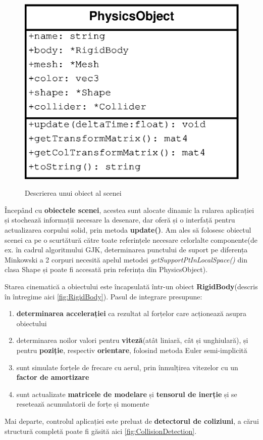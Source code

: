 \documentclass[12pt,a4paper]{report}
\begin{document}
\begin{figure}[H]
	\centering
	\includegraphics[width=0.4\linewidth]{pics/cap4_00.eps}
	\label{fig:physicsObject}
	\caption[]{Descrierea unui obiect al scenei}
\end{figure}

Începând cu \textbf{obiectele scenei}, acestea sunt alocate dinamic la rularea aplicației și stochează informații necesare la desenare, dar oferă și o interfață pentru actualizarea corpului solid, prin metoda \textbf{update()}. Am ales să folosesc obiectul scenei ca pe o scurtătură către toate referințele necesare celorlalte componente(de ex. în cadrul algoritmului GJK, determinarea punctului de suport pe diferența Minkowski a 2 corpuri necesită apelul metodei \textit{getSupportPtInLocalSpace()} din clasa Shape și poate fi accesată prin referința din PhysicsObject).

Starea cinematică a obiectului este încapsulată într-un obiect \textbf{RigidBody}(descris în întregime aici \ref{fig:RigidBody}). Pasul de integrare presupune:
\begin{enumerate}
	\item \textbf{determinarea accelerației} ca rezultat al forțelor care acționează asupra obiectului
	\item determinarea noilor valori pentru \textbf{viteză}(atât liniară, cât și unghiulară), și pentru \textbf{poziție}, respectiv \textbf{orientare}, folosind metoda Euler semi-implicită
	\item sunt simulate forțele de frecare cu aerul, prin înmulțirea vitezelor cu un \textbf{factor de amortizare}
	\item sunt actualizate \textbf{matricele de modelare} și \textbf{tensorul de inerție} și se resetează acumulatorii de forțe și momente 
\end{enumerate}

Mai departe, controlul aplicației este preluat de \textbf{detectorul de coliziuni}, a cărui structură completă poate fi găsită aici \ref{fig:CollisionDetection}.
\end{document}
